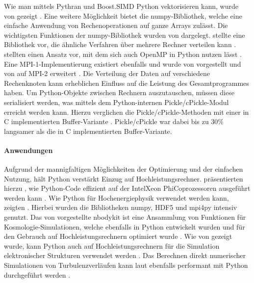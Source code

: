 Wie man mittels Pythran und Boost.SIMD Python vektorisieren kann, wurde \citeyear{GFB14} von \citeauthor{GFB14} gezeigt \cite{GFB14}. Eine weitere Möglichkeit bietet die numpy-Bibliothek, welche eine einfache Anwendung von Rechenoperationen auf ganze Arrays zulässt. Die wichtigsten Funktionen der numpy-Bibliothek wurden von \citeauthor{VCV11} dargelegt. \citeauthor{Dai09} stellte \citeyear{Dai09} eine Bibliothek vor, die ähnliche Verfahren über mehrere Rechner verteilen kann \cite{Dai09}. \citeauthor{GBA13} stellten \citeyear{GBA13} einen Ansatz vor, mit dem sich auch OpenMP in Python nutzen lässt \cite{GBA13}. Eine MPI-1-Implementierung existiert ebenfalls und wurde \citeyear{DPS05} von \citeauthor{DPS05} vorgestellt und \citeyear{DPS+08} von \citeauthor{DPS+08} auf MPI-2 erweitert \cite{DPS05,DPS+08}. Die Verteilung der Daten auf verschiedene Rechenknoten kann erheblichen Einfluss auf die Leistung des Gesamtprogrammes haben. Um Python-Objekte zwischen Rechnern auszutauschen, müssen diese serialisiert werden, was mittels dem Python-internen Pickle/cPickle-Modul erreicht werden kann. Hierzu verglichen \citeauthor{DPK+11} die Pickle/cPickle-Methoden mit einer in C implementierten Buffer-Variante \cite{DPK+11}. Pickle/cPickle war dabei bis zu 30\% langsamer als die in C implementierten Buffer-Variante. 

\paragraph{Anwendungen}

Aufgrund der mannigfaltigen Möglichkeiten der Optimierung und der einfachen Nutzung, hält Python verstärkt Einzug auf Hochleistungsrechner. \citeauthor{KE14} präsentierten hierzu \citeyear{KE14}, wie Python-Code effizient auf der Intel\textregistered Xeon Phi\texttrademark Coprozessoren ausgeführt werden kann \cite{KE14}. Wie Python für Hochenergiephysik verwendet werden kann, zeigten \citeauthor{SKP+17} \cite{SKP+17}. Hierbei wurden die Bibliotheken numpy, HDF5 und mpi4py intensiv genutzt. Das von \citeauthor{HF17} vorgestellte nbodykit ist eine Ansammlung von Funktionen für Kosmologie-Simulationen, welche ebenfalls in Python entwickelt wurden und für den Gebrauch auf Hochleistungsrechnern optimiert wurde \cite{HF17}. Wie \citeyear{ERS+11} von \citeauthor{ERS+11} gezeigt wurde, kann Python auch auf Hochleistungsrechnern für die Simulation elektronischer Strukturen verwendet werden \cite{ERS+11}. Das Berechnen direkt numerischer Simulationen von Turbulenzverläufen kann laut \citeauthor{ML16} ebenfalls performant mit Python durchgeführt werden \cite{ML16}.

